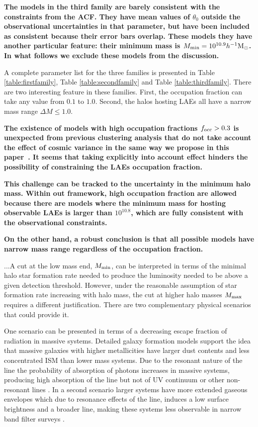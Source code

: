 \documentclass[usenatbib]{mn2e}
\newcommand{\documentname}{paper~}
\newcommand{\ly}{{\ifmmode{{\rm Ly}\alpha}\else{Ly$\alpha$~}\fi}}
\newcommand{\hMsun}{{\ifmmode{h^{-1}{\rm
        {M_{\odot}}}}\else{$h^{-1}{\rm{M_{\odot}}}$}\fi}}
\begin{document}
{\bf The models in the third family are barely consistent with the
  constraints from the ACF. They have mean values of $\theta_0$
  outside the observational uncertainties in that parameter, but have
  been included as consistent because their error bars overlap. These
models they have another particular feature: their minimum mass is
$M_{\rm min}=10^{10.9}\hMsun$. In what follows we exclude these models
from the discussion.}

A complete parameter list for the three families is presented in Table
\ref{table:firstfamily}, Table \ref{table:secondfamily} and Table
\ref{table:thirdfamily}. There are two interesting feature in these
families. First, the occupation fraction can take any value from $0.1$
to $1.0$. Second, the halos hosting LAEs all have a narrow mass range
$\Delta M\leq 1.0$. 

{\bf The existence of models with high occupation fractions $f_{\rm
    occ}>0.3$ is unexpected from previous clustering analysis that do
  not take  account the effect of cosmic variance in the same way we
  propose in this \documentname. It seems that taking explicitly into
  account  effect hinders the possibility of constraining the LAEs
  occupation fraction.} 

{\bf This challenge can be tracked to the uncertainty in the minimum
  halo mass. Within out framework, high occupation fraction are
  allowed because there are models where the minimum mass for hosting
  observable LAEs is larger than $10^{10.8}$\hMsun, which are fully
  consistent with the observational constraints.}

{\bf On the other hand, a robust conclusion is that all
possible models have narrow mass range regardless of the occupation
fraction.}

...A cut at the low mass end, $M_{\rm min}$, can be
interpreted in terms of the minimal halo star formation rate needed to
produce the \ly luminosity needed to be above a given detection
threshold.  However, under the reasonable assumption of star formation
rate increasing with halo mass, the cut at higher halo masses $M_{\rm
  max}$requires a different justification. There are two complementary physical
scenarios that could provide it.

One scenario can be presented in terms of a decreasing escape fraction
of \ly radiation in massive systems. Detailed galaxy formation models
support the idea that massive galaxies with higher metallicities have
larger dust contents and less concentrated ISM than lower mass
systems. Due to the resonant nature of the \ly line the probability of
absorption  of \ly photons increases in massive systems, producing
high absorption of the \ly line but not of UV continuum or other
non-resonant lines \citep{Laursen2009,ForeroRomero2011}. In a second
scenario larger systems have more extended gaseous envelopes which due
to resonance effects of the \ly line, induces a low surface brightness
and a broader line, making these systems less observable in narrow
band filter surveys \citep{Laursen2009,Zheng2010}.    
\end{document}

